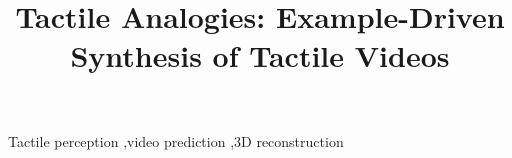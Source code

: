 \documentclass[times,twocolumn,final]{elsarticle}
\begin{document}
\begin{frontmatter}



\title{Tactile Analogies: Example-Driven Synthesis of Tactile Videos}


\author{} %






\begin{keyword}
Tactile perception \sep video prediction \sep 3D reconstruction
\end{keyword}

\end{frontmatter}
\end{document}
